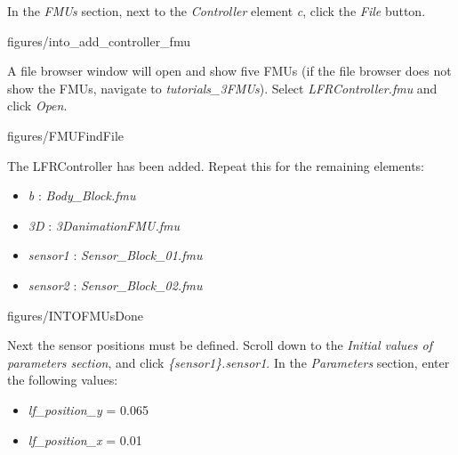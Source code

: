 \documentclass[11pt,a4paper]{../tutorial}
\begin{document}
\begin{instructions}
\item In the \emph{FMUs} section, next to the \emph{Controller} element \emph{c}, click the \emph{File} button.

    \begin{annotation}[width=0.85\linewidth,trim=0 600 0 100,clip]{figures/into_add_controller_fmu}
    \end{annotation}

\newpage
\item A file browser window will open and show five FMUs (if the file browser does not show the FMUs, navigate to \emph{tutorials\_3\pathsep{}FMUs}). Select \emph{LFRController.fmu} and click \emph{Open}.

    \begin{annotation}[width=0.8\linewidth]{figures/FMUFindFile}
    \end{annotation}

\item The LFRController has been added. Repeat this for the remaining elements:

    \begin{itemize}[noitemsep]
        \item \emph{b} : \emph{Body\_Block.fmu}
        \item \emph{3D} : \emph{3DanimationFMU.fmu}
        \item \emph{sensor1} : \emph{Sensor\_Block\_01.fmu}
        \item \emph{sensor2} : \emph{Sensor\_Block\_02.fmu}
    \end{itemize}

    \begin{annotation}[width=0.54\linewidth,trim=150 0 0 0,clip]{figures/INTOFMUsDone}
    \end{annotation}

\newpage
\item Next the sensor positions must be defined. Scroll down to the \emph{Initial values of parameters section}, and click \emph{\{sensor1\}.sensor1}. In the \emph{Parameters} section, enter the following values:

    \begin{itemize}
        \item \emph{lf\_position\_y} = 0.065
        \item \emph{lf\_position\_x} = 0.01
    \end{itemize}


\end{instructions}
\end{document}
